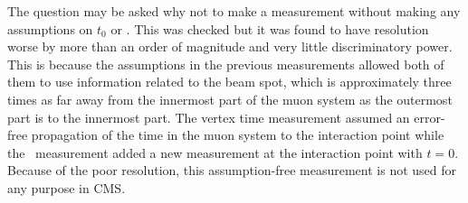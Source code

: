 The question may be asked why not to make a measurement without making any assumptions on $t_0$ or \invbeta. This was checked but it was found to have
resolution worse by more than an order of magnitude and very little discriminatory power.
This is because the assumptions in the previous measurements allowed both of them to use information
related to the beam spot, which is approximately three times as far away from the innermost part of the muon system as the outermost part is to the innermost part.
The vertex time measurement assumed an error-free propagation of the time in the muon system to the interaction point while the \invbeta\ measurement
added a new measurement at the interaction point with $t = 0$. Because of the poor resolution, this assumption-free measurement is not used for any purpose in CMS.


